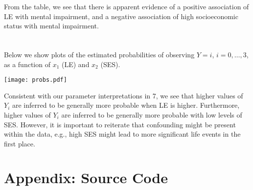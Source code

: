 \documentclass[11pt]{article}
\renewcommand\;{\,}
\begin{document}
From the table, we see that there is apparent evidence of a positive association of LE with mental impairment, and a negative association of high socioeconomic status with mental impairment. 

\section{}
Below we show plots of the estimated probabilities of observing $Y = i$, 
$i = 0, \dotsc, 3$, as a function of $x_1$ (LE) and $x_2$ (SES).
\begin{center}
\texttt{[image: probs.pdf]}
\end{center}
Consistent with our parameter interpretations in 7, we see that higher values of $Y_i$ are inferred to be generally more probable when LE is higher. Furthermore, higher values of $Y_i$ are inferred to be generally more probable with low levels of SES. However, it is important to reiterate that confounding might be present within the data, e.g., high SES might lead to more significant life events in the first place.

\scriptsize
\section*{Appendix: Source Code}

\end{document}

